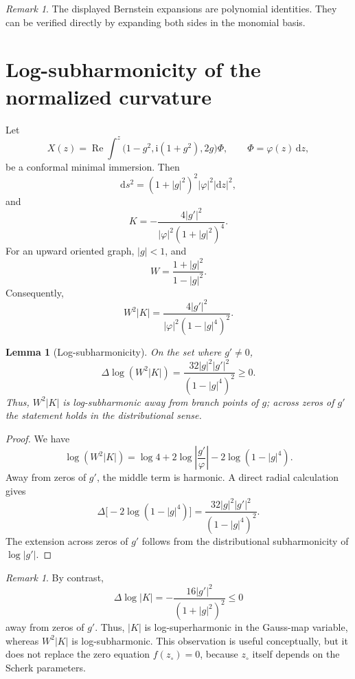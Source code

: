 \documentclass[11pt]{amsart}
\newtheorem{lemma}[theorem]{Lemma}
\theoremstyle{remark}
\newtheorem{remark}[theorem]{Remark}
\newcommand{\ii}{\mathrm i}
\newcommand{\dd}{\mathrm d}
\newcommand{\zc}{z_\circ}
\numberwithin{equation}{section}
\begin{document}
\begin{remark}
The displayed Bernstein expansions are polynomial identities. They can be verified directly by expanding both sides in the monomial basis.
\end{remark}

\section{Log-subharmonicity of the normalized curvature}\label{app:log}

Let
\[
        X(z)=\operatorname{Re}\int^z
        \bigl(1-g^2,\ii(1+g^2),2g\bigr)\Phi,
        \qquad
        \Phi=\varphi(z)\,\dd z,
\]
be a conformal minimal immersion. Then
\[
        \dd s^2=(1+|g|^2)^2|\varphi|^2|\dd z|^2,
\]
and
\[
        K=-\frac{4|g'|^2}{|\varphi|^2(1+|g|^2)^4}.
\]
For an upward oriented graph, $|g|<1$, and
\[
        W=\frac{1+|g|^2}{1-|g|^2}.
\]
Consequently,
\[
        W^2|K|=
        \frac{4|g'|^2}{|\varphi|^2(1-|g|^4)^2}.
\]

\begin{lemma}[Log-subharmonicity]\label{lem:log-subharmonicity}
On the set where $g'\neq 0$,
\[
        \Delta\log(W^2|K|)
        =\frac{32|g|^2|g'|^2}{(1-|g|^4)^2}\geq 0.
\]
Thus, $W^2|K|$ is log-subharmonic away from branch points of $g$; across zeros of $g'$ the statement holds in the distributional sense.
\end{lemma}

\begin{proof}
We have
\[
        \log(W^2|K|)
        =\log4+2\log\left|\frac{g'}{\varphi}\right|
        -2\log(1-|g|^4).
\]
Away from zeros of $g'$, the middle term is harmonic. A direct radial calculation gives
\[
        \Delta\bigl[-2\log(1-|g|^4)\bigr]
        =\frac{32|g|^2|g'|^2}{(1-|g|^4)^2}.
\]
The extension across zeros of $g'$ follows from the distributional subharmonicity of $\log|g'|$.
\end{proof}

\begin{remark}
By contrast,
\[
        \Delta\log|K|
        =-
        \frac{16|g'|^2}{(1+|g|^2)^2}
        \leq 0
\]
away from zeros of $g'$. Thus, $|K|$ is log-superharmonic in the Gauss-map variable, whereas $W^2|K|$ is log-subharmonic. This observation is useful conceptually, but it does not replace the zero equation $f(\zc)=0$, because $\zc$ itself depends on the Scherk parameters.
\end{remark}
\end{document}
